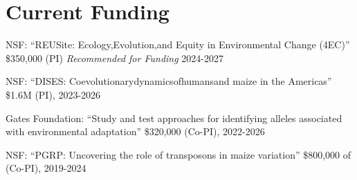 \documentclass[letterpaper,10pt]{article}
\renewenvironment{itemize}{
  \begin{list}{}{
    \setlength{\leftmargin}{1.5em}
  }
}{
  \end{list}
}
\begin{document}
\section*{Current Funding}
\begin{itemize}
\item NSF: ``REUSite: Ecology,Evolution,and Equity in Environmental Change (4EC)'' \$350,000 (PI) \textit{Recommended for Funding} 2024-2027
\item NSF: ``DISES: Coevolutionarydynamicsofhumansand maize in the Americas'' \$1.6M (PI), 2023-2026
\item Gates Foundation: ``Study and test approaches for identifying alleles associated with environmental adaptation'' \$320,000 (Co-PI), 2022-2026
\item NSF: ``PGRP: Uncovering the role of transposons in maize variation'' \$800,000 of (Co-PI), 2019-2024%

\end{itemize}
\end{document}
